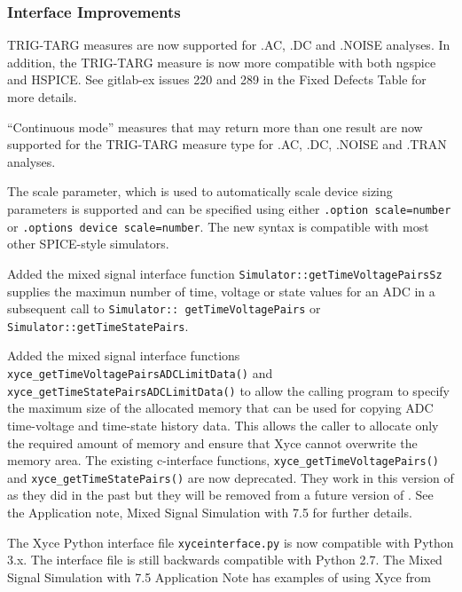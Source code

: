 \documentclass[letterpaper]{scrartcl}
\begin{document}
\subsubsection*{Interface Improvements}
\begin{XyceItemize}
  \item TRIG-TARG measures are now supported for .AC, .DC and .NOISE
    analyses.  In addition, the TRIG-TARG measure is now more
    compatible with both ngspice and HSPICE.  See gitlab-ex issues 220
    and 289 in the Fixed Defects Table for more details.
  \item ``Continuous mode'' measures that may return more than one
    result are now supported for the TRIG-TARG measure type for .AC,
    .DC, .NOISE and .TRAN analyses.
  \item The scale parameter, which is used to automatically scale
    device sizing parameters is supported and can be specified using
    either \texttt{.option scale=number} or \texttt{.options device
      scale=number}.  The new syntax is
   compatible with most other SPICE-style simulators.
  \item Added the mixed signal interface function
    \texttt{Simulator::getTimeVoltagePairsSz} supplies the maximun
    number of time, voltage or state values for an ADC in a subsequent
    call to \texttt{Simulator:: getTimeVoltagePairs} or
    \texttt{Simulator::getTimeStatePairs}.
  \item Added the mixed signal interface functions
    \texttt{xyce\_getTimeVoltagePairs\-ADCLimitData()} and
    \texttt{xyce\-\_getTimeStatePairs\-ADCLimitData()} to allow the
    calling program to specify the maximum size of the allocated
    memory that can be used for copying ADC time-voltage and
    time-state history data.  This allows the caller to allocate only
    the required amount of memory and ensure that Xyce cannot
    overwrite the memory area.  The existing c-interface functions,
    \texttt{xyce\_getTimeVoltagePairs()} and
    \texttt{xyce\_getTimeStatePairs()} are now deprecated. They work
    in this version of \Xyce{} as they did in the past but they will
    be removed from a future version of \Xyce{}.  See the Application
    note, Mixed Signal Simulation with \Xyce{} 7.5 for further
    details.
  \item The Xyce Python interface file \texttt{xyce\-interface.py} is
    now compatible with Python 3.x.  The interface file is still
    backwards compatible with Python 2.7. The Mixed Signal Simulation
    with \Xyce{} 7.5 Application Note has examples of using Xyce from

\end{XyceItemize}
\end{document}
